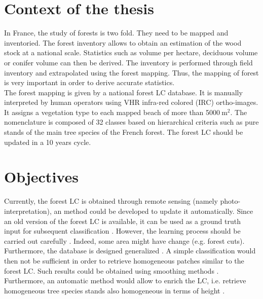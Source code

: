 \section{Context of the thesis}
In France, the study of forests is two fold. They need to be mapped and inventoried. The forest inventory allows to obtain an estimation of the wood stock at a national scale. Statistics such as volume per hectare, deciduous volume or conifer volume can then be derived. The inventory is performed through field inventory and extrapolated using the forest mapping. Thus, the mapping of forest is very important in order to derive accurate statistics. \\
The forest mapping is given by a national forest LC database. It is manually interpreted by human operators using VHR infra-red colored (IRC) ortho-images. It assigns a vegetation type to each mapped beach of more than 5000$\:$m$^{2}$. The nomenclature is composed of 32 classes based on hierarchical criteria such as pure stands of the main tree species of the French forest. The forest LC should be updated in a 10 years cycle.

\section{Objectives}
Currently, the forest LC is obtained through remote sensing (namely photo-inter\-pretation), an method could be developed to update it automatically. Since an old version of the forest LC is available, it can be used as a ground truth input for subsequent classification \citep{gressin2013updating}. However, the learning process should be carried out carefully \citep{gressin2014updating}. Indeed, some area might have change (e.g. forest cuts). Furthermore, the database is designed generalized \citep{smith1977database}. A simple classification would then not be sufficient in order to retrieve homogeneous patches similar to the forest LC. Such results could be obtained using smoothing methods \citep{schindler2012overview}. Furthermore, an automatic method would allow to enrich the LC, i.e. retrieve homogeneous tree species stands also homogeneous in terms of height \citep{gressin2014unified}.

